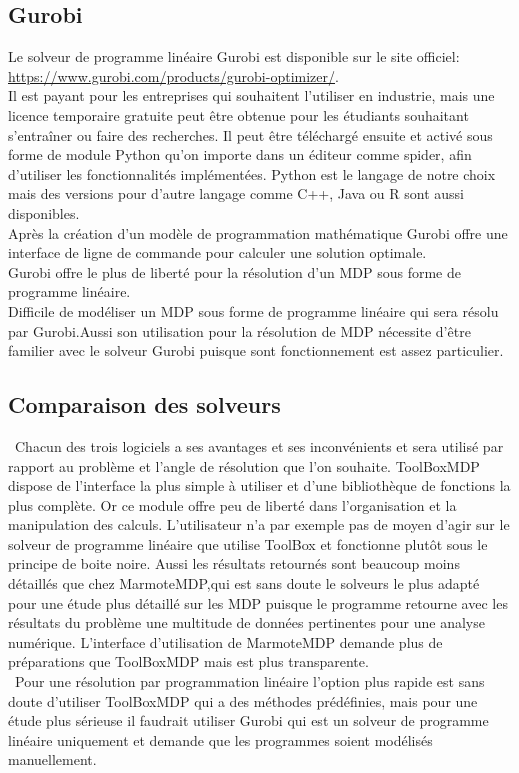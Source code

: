 \documentclass{article}
\begin{document}
\subsection{Gurobi}
Le solveur de programme linéaire Gurobi est disponible sur le site officiel: \url{https://www.gurobi.com/products/gurobi-optimizer/}.\\
Il est payant pour les entreprises qui souhaitent l'utiliser en industrie, mais une licence temporaire gratuite peut être obtenue pour les étudiants souhaitant s'entraîner ou faire des recherches. Il peut être téléchargé ensuite et activé sous forme de module Python qu'on importe dans un éditeur comme spider, afin d'utiliser les fonctionnalités implémentées. Python est le langage de notre choix mais des versions pour d'autre langage comme C++, Java ou R sont aussi disponibles.\\
Après la création d'un modèle de programmation mathématique Gurobi offre une interface de ligne de commande pour calculer une solution optimale.\\
Gurobi offre le plus de liberté pour la résolution d'un MDP sous forme de programme linéaire.\\
Difficile de modéliser un MDP sous forme de programme linéaire qui sera résolu par Gurobi.Aussi son utilisation pour la résolution de MDP nécessite d'être familier avec le solveur Gurobi puisque sont fonctionnement est assez particulier.\\

\subsection{Comparaison des solveurs}
\  Chacun des trois logiciels a ses avantages et ses inconvénients et sera utilisé par rapport au problème et l'angle de résolution que l'on souhaite. ToolBoxMDP dispose de l'interface la plus simple à utiliser et d'une bibliothèque de fonctions la plus complète. Or ce module offre peu de liberté dans l'organisation et la manipulation des calculs. L'utilisateur n'a par exemple pas de moyen d'agir sur le solveur de programme linéaire que utilise ToolBox et fonctionne plutôt sous le principe de boite noire. Aussi les résultats retournés sont beaucoup moins détaillés que chez MarmoteMDP,qui est sans doute le solveurs le plus adapté pour une étude plus détaillé sur les MDP puisque le programme retourne avec les résultats du problème une multitude de données pertinentes pour une analyse numérique. L'interface d'utilisation de MarmoteMDP demande plus de préparations que ToolBoxMDP mais est plus transparente. \\
\  Pour une résolution par programmation linéaire l'option plus rapide est sans doute d'utiliser ToolBoxMDP qui a des méthodes prédéfinies, mais pour une étude plus sérieuse il faudrait utiliser Gurobi qui est un solveur de programme linéaire uniquement et demande que les programmes soient modélisés manuellement.
\end{document}
